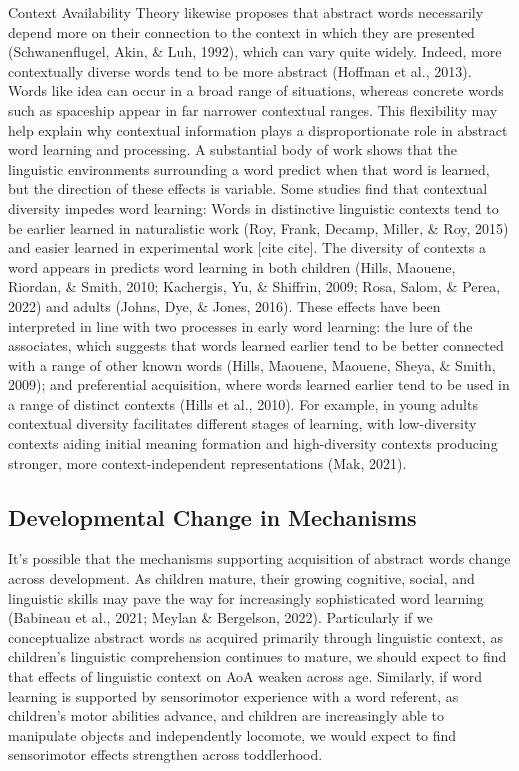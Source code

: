\documentclass[
  man,floatsintext]{apa6}
\begin{document}
Context Availability Theory likewise proposes that abstract words necessarily depend more on their connection to the context in which they are presented (Schwanenflugel, Akin, \& Luh, 1992), which can vary quite widely. Indeed, more contextually diverse words tend to be more abstract (Hoffman et al., 2013). Words like idea can occur in a broad range of situations, whereas concrete words such as spaceship appear in far narrower contextual ranges. This flexibility may help explain why contextual information plays a disproportionate role in abstract word learning and processing. A substantial body of work shows that the linguistic environments surrounding a word predict when that word is learned, but the direction of these effects is variable. Some studies find that contextual diversity impedes word learning: Words in distinctive linguistic contexts tend to be earlier learned in naturalistic work (Roy, Frank, Decamp, Miller, \& Roy, 2015) and easier learned in experimental work {[}cite cite{]}. The diversity of contexts a word appears in predicts word learning in both children (Hills, Maouene, Riordan, \& Smith, 2010; Kachergis, Yu, \& Shiffrin, 2009; Rosa, Salom, \& Perea, 2022) and adults (Johns, Dye, \& Jones, 2016). These effects have been interpreted in line with two processes in early word learning: the lure of the associates, which suggests that words learned earlier tend to be better connected with a range of other known words (Hills, Maouene, Maouene, Sheya, \& Smith, 2009); and preferential acquisition, where words learned earlier tend to be used in a range of distinct contexts (Hills et al., 2010). For example, in young adults contextual diversity facilitates different stages of learning, with low-diversity contexts aiding initial meaning formation and high-diversity contexts producing stronger, more context-independent representations (Mak, 2021).

\subsection{Developmental Change in Mechanisms}\label{developmental-change-in-mechanisms}

It's possible that the mechanisms supporting acquisition of abstract words change across development. As children mature, their growing cognitive, social, and linguistic skills may pave the way for increasingly sophisticated word learning (Babineau et al., 2021; Meylan \& Bergelson, 2022). Particularly if we conceptualize abstract words as acquired primarily through linguistic context, as children's linguistic comprehension continues to mature, we should expect to find that effects of linguistic context on AoA weaken across age. Similarly, if word learning is supported by sensorimotor experience with a word referent, as children's motor abilities advance, and children are increasingly able to manipulate objects and independently locomote, we would expect to find sensorimotor effects strengthen across toddlerhood.
\end{document}
